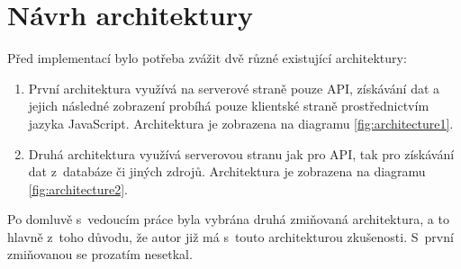 \section{Návrh architektury}
Před implementací bylo potřeba zvážit dvě různé existující architektury:

\begin{enumerate}
    \item První architektura využívá na serverové straně pouze API, získávání dat a jejich následné zobrazení probíhá pouze klientské straně prostřednictvím jazyka JavaScript. Architektura je zobrazena na diagramu \ref{fig:architecture1}.
    \item Druhá architektura využívá serverovou stranu jak pro API, tak pro získávání dat z~databáze či jiných zdrojů. Architektura je zobrazena na diagramu \ref{fig:architecture2}.
\end{enumerate}

Po domluvě s~vedoucím práce byla vybrána druhá zmiňovaná architektura, a to hlavně z~toho důvodu, že autor již má s~touto architekturou zkušenosti. S~první zmiňovanou se prozatím nesetkal.


